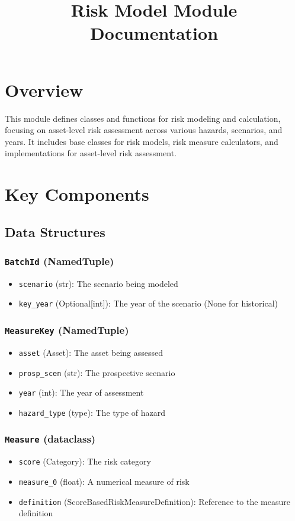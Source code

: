 \documentclass{article}
\title{Risk Model Module Documentation}
\author{}
\date{}
\begin{document}
\maketitle

\section{Overview}

This module defines classes and functions for risk modeling and calculation, focusing on asset-level risk assessment across various hazards, scenarios, and years. It includes base classes for risk models, risk measure calculators, and implementations for asset-level risk assessment.

\section{Key Components}

\subsection{Data Structures}

\subsubsection{\texttt{BatchId} (NamedTuple)}
\begin{itemize}
    \item \texttt{scenario} (str): The scenario being modeled
    \item \texttt{key\_year} (Optional[int]): The year of the scenario (None for historical)
\end{itemize}

\subsubsection{\texttt{MeasureKey} (NamedTuple)}
\begin{itemize}
    \item \texttt{asset} (Asset): The asset being assessed
    \item \texttt{prosp\_scen} (str): The prospective scenario
    \item \texttt{year} (int): The year of assessment
    \item \texttt{hazard\_type} (type): The type of hazard
\end{itemize}

\subsubsection{\texttt{Measure} (dataclass)}
\begin{itemize}
    \item \texttt{score} (Category): The risk category
    \item \texttt{measure\_0} (float): A numerical measure of risk
    \item \texttt{definition} (ScoreBasedRiskMeasureDefinition): Reference to the measure definition
\end{itemize}
\end{document}
